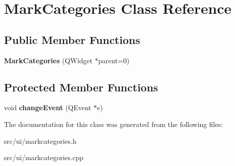 \hypertarget{classMarkCategories}{
\section{MarkCategories Class Reference}
\label{classMarkCategories}
}
\subsection*{Public Member Functions}
\begin{DoxyCompactItemize}
\item 
\hypertarget{classMarkCategories_a31c4ae2276ea03f677e2c3e0cecb5b2c}{
{\bfseries MarkCategories} (QWidget $\ast$parent=0)}
\label{classMarkCategories_a31c4ae2276ea03f677e2c3e0cecb5b2c}

\end{DoxyCompactItemize}
\subsection*{Protected Member Functions}
\begin{DoxyCompactItemize}
\item 
\hypertarget{classMarkCategories_a23cc0c5704f2da8ba2546feadb9f154d}{
void {\bfseries changeEvent} (QEvent $\ast$e)}
\label{classMarkCategories_a23cc0c5704f2da8ba2546feadb9f154d}

\end{DoxyCompactItemize}


The documentation for this class was generated from the following files:\begin{DoxyCompactItemize}
\item 
src/ui/markcategories.h\item 
src/ui/markcategories.cpp\end{DoxyCompactItemize}
